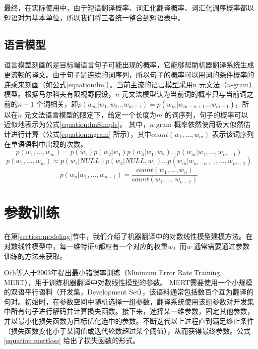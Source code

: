 \documentclass[master, winfont]{njuthesis}
\begin{document}
最终，在实际使用中，由于短语翻译概率、词汇化翻译概率、词汇化调序概率都以短语对为基本单位，所以我们将三者统一整合到短语表中。

\subsection{语言模型}
语言模型刻画的是目标端语言句子可能出现的概率，它能够帮助机器翻译系统生成更流畅的译文。由于句子是连续的词序列，所以句子的概率可以用词的条件概率的连乘来刻画（如公式\ref{equation:lm}）。当前主流的语言模型采用n 元文法（$n$-gram）模型\cite{manning1999foundations}。根据马尔科夫有限视野假设，$n$ 元文法模型认为当前词的概率只与当前词之前的$n-1$ 个词相关，即$p(w_m|w_1,w_2...w_{m-1})=p(w_m|w_{m-n+1}...w_{m-1})$，所以在$n$ 元文法语言模型的限定下，给定一个长度为$m$ 的词序列，句子的概率可以近似地表示为公式\ref{equation:lmSimple}。 其中，$n$-gram 概率依然使用极大似然估计进行计算（公式\ref{equation:ngram} 所示），其中$count(w_1,...,w_m)$ 表示该词序列在单语语料中出现的次数。
\begin{equation}
  \label{equation:lm}
      p(w_1,...,w_m) = p(w_1)p(w_2|w_1)p(w_3|w_1,w_2)...p(w_m|w_1,...,w_{m-1})
\end{equation}
\begin{equation}
  \label{equation:lmSimple}
  p(w_1,...,w_m) \approx p(w_1|NULL)p(w_2|NULL,w_1)...p(w_m|w_{m-n+1},...,w_{m-1})
\end{equation}
\begin{equation}
  \label{equation:ngram}
  p(w_n|w_1,...,w_{n-1})=\frac{count(w_1,...,w_n)}{count(w_1,...,w_{n-1})}
\end{equation}

\section{参数训练}\label{section:parameter}
在第\ref{section:modeling}节中，我们介绍了机器翻译中的对数线性模型建模方法。在对数线性模型中，每一维特征$h$都应有一个对应的权重$w$，而$w$ 通常需要通过参数训练的方法来获取。

Och等人\cite{och2003minimum}于2003年提出最小错误率训练（Minimum Error Rate Training, MERT），用于训练机器翻译中对数线性模型的参数。
MERT需要使用一个小规模的双语平行语料（开发集，Development Set），该语料通常包括数百个互为翻译的句对。初始时，在参数空间中随机选择一组参数，翻译系统使用该组参数对开发集中所有句子进行解码并计算损失函数。接下来，选择某一维参数，固定其他参数，并以最小化损失函数为目标优化选中的参数。不断迭代以上过程直到满足终止条件（损失函数变化小于某阈值或迭代轮数超过某个阈值），从而获得最终参数。公式\ref{equation:mertloss} 给出了损失函数的形式。
\end{document}

